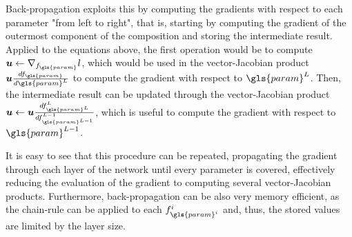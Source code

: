 Back-propagation exploits this by computing the gradients with respect to each parameter "from left to right", that is, starting by computing the gradient of the outermost component of the composition and storing the intermediate result.
Applied to the equations above, the first operation would be to compute $\bm{u}\gets\nabla_{f_{\gls{param}}} l$, which would be used in the vector-Jacobian product $\bm{u} \frac{d f_{\gls{param}}}{d \gls{param}^L}$ to compute the gradient with respect to $\gls{param}^{L}$.
Then, the intermediate result can be updated through the vector-Jacobian product $\bm{u}\gets \bm{u} \frac{d f^L_{\gls{param}^L}}{d f^{L-1}_{\gls{param}^{L-1}}}$, which is useful to compute the gradient with respect to $\gls{param}^{L-1}$.

It is easy to see that this procedure can be repeated, propagating the gradient through each layer of the network until every parameter is covered, effectively reducing the evaluation of the gradient to computing several vector-Jacobian products.
Furthermore, back-propagation can be also very memory efficient, as the chain-rule can be applied to each $f^i_{\gls{param}^i}$ and, thus, the stored values are limited by the layer size\footnotemark.

% 

